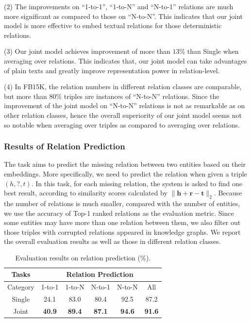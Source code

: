 \documentclass[11pt,a4paper]{article}
\begin{document}
(2) The improvements on ``1-to-1'', ``1-to-N'' and ``N-to-1'' relations are much more significant as compared to those on ``N-to-N''. This indicates that our joint model is more effective to embed textual relations for those deterministic relations.

(3) Our joint model achieves improvement of more than $13\%$ than Single when averaging over relations. This indicates that, our joint model can take advantages of plain texts and greatly improve representation power in relation-level.

(4) In FB15K, the relation numbers in different relation classes are comparable, but more than $80\%$ triples are instances of ``N-to-N'' relations. Since the improvement of the joint model on ``N-to-N'' relations is not as remarkable as on other relation classes, hence the overall superiority of our joint model seems not so notable when averaging over triples as compared to averaging over relations.

\subsubsection{Results of Relation Prediction}
The task aims to predict the missing relation between two entities based on their embeddings. More specifically, we need to predict the relation when given a triple $(h, ?, t)$. In this task, for each missing relation, the system is asked to find one best result, according to similarity scores calculated by $\lVert \textbf{h} + \textbf{r} - \textbf{t} \rVert_2$.
Because the number of relations is much smaller, compared with the number of entities, we use the accuracy of Top-1 ranked relations as the evaluation metric. Since some entities may have more than one relation between them, we also filter out those triples with corrupted relations appeared in knowledge graphs. We report the overall evaluation results as well as those in different relation classes.

\begin{table}[htb]
\centering
\scriptsize
\begin{tabular}{|c|c|c|c|c|c|}
\hline
Tasks             & \multicolumn{5}{c|}{Relation Prediction}                      \\ \hline
Category & 1-to-1     & 1-to-N     & N-to-1     & N-to-N     & All           \\ \hline
Single       & 24.1       & 83.0       & 80.4       & 92.5       & 87.2          \\ \hline
Joint             & \textbf{40.9} & \textbf{89.4} & \textbf{87.1} & \textbf{94.6} & \textbf{91.6} \\ \hline
\end{tabular}
\caption{Evaluation results on relation prediction (\%).}
\label{t:relation}
\end{table}
\end{document}
